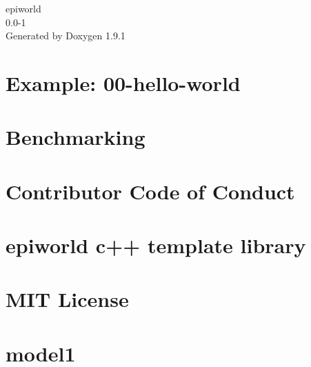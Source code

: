\let\mypdfximage\pdfximage\def\pdfximage{\immediate\mypdfximage}\documentclass[twoside]{book}
\newcommand{\+}{\discretionary{\mbox{\scriptsize$\hookleftarrow$}}{}{}}
\newcommand{\clearemptydoublepage}{%
  \newpage{\pagestyle{empty}\cleardoublepage}%
}
\begin{document}
\raggedbottom

\hypersetup{pageanchor=false,
             bookmarksnumbered=true,
             pdfencoding=unicode
            }
\begin{titlepage}
\vspace*{7cm}
\begin{center}%
{\Large epiworld \\[1ex]\large 0.\+0-\/1 }\\
\vspace*{1cm}
{\large Generated by Doxygen 1.9.1}\\
\end{center}
\end{titlepage}
\clearemptydoublepage
{}
\tableofcontents
\clearemptydoublepage
{}
\hypersetup{pageanchor=true}

\chapter{Example\+: 00-\/hello-\/world}
\label{index}\hypertarget{index}{}
\chapter{Benchmarking}
\label{md_benchmark__r_e_a_m_e}

\chapter{Contributor Code of Conduct}
\label{md__c_o_d_e__o_f__c_o_n_d_u_c_t}

\chapter{epiworld c++ template library}
\label{md_examples_07_surveillance_07_surveillance}

\chapter{MIT License}
\label{md__l_i_c_e_n_s_e}

\chapter{model1}
\label{md_model1}

\end{document}
